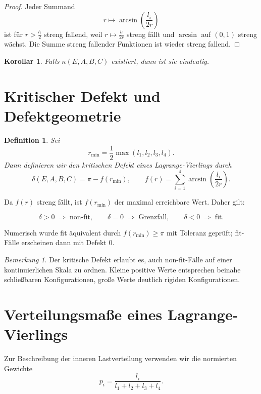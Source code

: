\documentclass[11pt,a4paper]{article}
\newtheorem{definition}{Definition}
\newtheorem{korollar}{Korollar}
\theoremstyle{remark}
\newtheorem{bemerkung}{Bemerkung}
\begin{document}
	\begin{proof}
		Jeder Summand
		\[
		r\mapsto \arcsin\!\left(\frac{l_i}{2r}\right)
		\]
		ist für \(r>\frac{l_i}{2}\) streng fallend, weil \(r\mapsto \frac{l_i}{2r}\) streng fällt und \(\arcsin\) auf \((0,1)\) streng wächst. Die Summe streng fallender Funktionen ist wieder streng fallend.
	\end{proof}
	
	\begin{korollar}
		Falls \(\kappa(E,A,B,C)\) existiert, dann ist sie eindeutig.
	\end{korollar}
	
	\section{Kritischer Defekt und Defektgeometrie}
	
	\begin{definition}
		Sei
		\[
		r_{\min}=\frac12\max(l_1,l_2,l_3,l_4).
		\]
		Dann definieren wir den \emph{kritischen Defekt} eines Lagrange-Vierlings durch
		\[
		\delta(E,A,B,C)=\pi-f(r_{\min}),
		\qquad
		f(r)=\sum_{i=1}^4 \arcsin\!\left(\frac{l_i}{2r}\right).
		\]
	\end{definition}
	
	Da \(f(r)\) streng fällt, ist \(f(r_{\min})\) der maximal erreichbare Wert. Daher gilt:
	
	\[
	\delta>0 \;\Longrightarrow\; \text{non-fit},
	\qquad
	\delta=0 \;\Longrightarrow\; \text{Grenzfall},
	\qquad
	\delta<0 \;\Longrightarrow\; \text{fit}.
	\]
	
	Numerisch wurde fit äquivalent durch \(f(r_{\min})\ge\pi\) mit Toleranz geprüft; fit-Fälle erscheinen dann mit Defekt \(0\).
	
	\begin{bemerkung}
		Der kritische Defekt erlaubt es, auch non-fit-Fälle auf einer kontinuierlichen Skala zu ordnen. Kleine positive Werte entsprechen beinahe schließbaren Konfigurationen, große Werte deutlich rigiden Konfigurationen.
	\end{bemerkung}
	
	\section{Verteilungsmaße eines Lagrange-Vierlings}
	
	Zur Beschreibung der inneren Lastverteilung verwenden wir die normierten Gewichte
	\[
	p_i=\frac{l_i}{l_1+l_2+l_3+l_4}.
	\]
	
\end{document}
